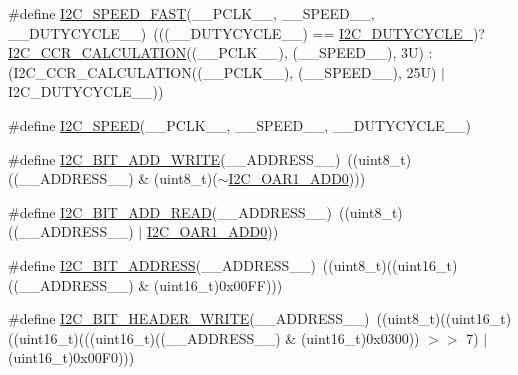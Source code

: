 \begin{DoxyCompactItemize}
\item 
\#define \hyperlink{group___i2_c___private___macros_ga9e5a85344d70ab05020e41ba24566f57}{I2\+C\+\_\+\+S\+P\+E\+E\+D\+\_\+\+F\+A\+ST}(\+\_\+\+\_\+\+P\+C\+L\+K\+\_\+\+\_\+,  \+\_\+\+\_\+\+S\+P\+E\+E\+D\+\_\+\+\_\+,  \+\_\+\+\_\+\+D\+U\+T\+Y\+C\+Y\+C\+L\+E\+\_\+\+\_\+)~(((\+\_\+\+\_\+\+D\+U\+T\+Y\+C\+Y\+C\+L\+E\+\_\+\+\_\+) == \hyperlink{group___i2_c__duty__cycle__in__fast__mode_ga414df076d339793a7c761033346fd4ca}{I2\+C\+\_\+\+D\+U\+T\+Y\+C\+Y\+C\+L\+E\+\_})? \hyperlink{group___i2_c___private___macros_ga647da9b3c71c56e2e1b49417bc557233}{I2\+C\+\_\+\+C\+C\+R\+\_\+\+C\+A\+L\+C\+U\+L\+A\+T\+I\+ON}((\+\_\+\+\_\+\+P\+C\+L\+K\+\_\+\+\_\+), (\+\_\+\+\_\+\+S\+P\+E\+E\+D\+\_\+\+\_\+), 3\+U) \+: (\+I2\+C\+\_\+\+C\+C\+R\+\_\+\+C\+A\+L\+C\+U\+L\+A\+T\+I\+O\+N((\+\_\+\+\_\+\+P\+C\+L\+K\+\_\+\+\_\+), (\+\_\+\+\_\+\+S\+P\+E\+E\+D\+\_\+\+\_\+), 25\+U) $\vert$ I2\+C\+\_\+\+D\+U\+T\+Y\+C\+Y\+C\+L\+E\+\_\+\_))
\item 
\#define \hyperlink{group___i2_c___private___macros_ga0e871b470a0f7a9d641156f07e37c810}{I2\+C\+\_\+\+S\+P\+E\+ED}(\+\_\+\+\_\+\+P\+C\+L\+K\+\_\+\+\_\+,  \+\_\+\+\_\+\+S\+P\+E\+E\+D\+\_\+\+\_\+,  \+\_\+\+\_\+\+D\+U\+T\+Y\+C\+Y\+C\+L\+E\+\_\+\+\_\+)
\item 
\#define \hyperlink{group___i2_c___private___macros_gad83949bd18eca67258b05763a90d0128}{I2\+C\+\_\+B\+I\+T\+\_\+\+A\+D\+D\+\_\+\+W\+R\+I\+TE}(\+\_\+\+\_\+\+A\+D\+D\+R\+E\+S\+S\+\_\+\+\_\+)~((uint8\+\_\+t)((\+\_\+\+\_\+\+A\+D\+D\+R\+E\+S\+S\+\_\+\+\_\+) \& (uint8\+\_\+t)($\sim$\hyperlink{group___peripheral___registers___bits___definition_ga8b7c20c81f79d17921718412b8fca6d7}{I2\+C\+\_\+\+O\+A\+R1\+\_\+\+A\+D\+D0})))
\item 
\#define \hyperlink{group___i2_c___private___macros_gacec6f0d6fde48a24327d2db15387fed8}{I2\+C\+\_\+B\+I\+T\+\_\+\+A\+D\+D\+\_\+\+R\+E\+AD}(\+\_\+\+\_\+\+A\+D\+D\+R\+E\+S\+S\+\_\+\+\_\+)~((uint8\+\_\+t)((\+\_\+\+\_\+\+A\+D\+D\+R\+E\+S\+S\+\_\+\+\_\+) $\vert$ \hyperlink{group___peripheral___registers___bits___definition_ga8b7c20c81f79d17921718412b8fca6d7}{I2\+C\+\_\+\+O\+A\+R1\+\_\+\+A\+D\+D0}))
\item 
\#define \hyperlink{group___i2_c___private___macros_ga51ad2b93ef13577d3d437507e09191cd}{I2\+C\+\_\+B\+I\+T\+\_\+\+A\+D\+D\+R\+E\+SS}(\+\_\+\+\_\+\+A\+D\+D\+R\+E\+S\+S\+\_\+\+\_\+)~((uint8\+\_\+t)((uint16\+\_\+t)((\+\_\+\+\_\+\+A\+D\+D\+R\+E\+S\+S\+\_\+\+\_\+) \& (uint16\+\_\+t)0x00\+F\+F)))
\item 
\#define \hyperlink{group___i2_c___private___macros_ga0edd591eaa2ce5511148bf1ebf533e1a}{I2\+C\+\_\+B\+I\+T\+\_\+\+H\+E\+A\+D\+E\+R\+\_\+\+W\+R\+I\+TE}(\+\_\+\+\_\+\+A\+D\+D\+R\+E\+S\+S\+\_\+\+\_\+)~((uint8\+\_\+t)((uint16\+\_\+t)((uint16\+\_\+t)(((uint16\+\_\+t)((\+\_\+\+\_\+\+A\+D\+D\+R\+E\+S\+S\+\_\+\+\_\+) \& (uint16\+\_\+t)0x0300)) $>$$>$ 7) $\vert$ (uint16\+\_\+t)0x00\+F0)))
$$
\end{DoxyCompactItemize}
